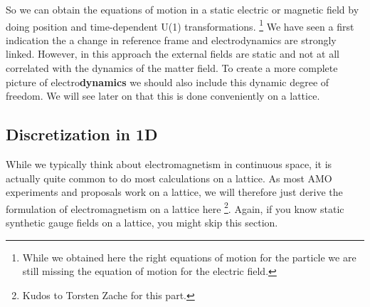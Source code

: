 \documentclass[10pt]{article}
\begin{document}
So we can obtain the equations of motion in a static electric or magnetic field by doing position and time-dependent U(1) transformations.
\footnote{While we obtained here the right equations of motion for the particle we are still missing the equation of motion for the electric field.}
We have seen a first indication the a change in reference frame and electrodynamics are strongly linked. However, in this approach the external fields are static and not at all correlated with the dynamics of the matter field. To create a more complete picture of electro\textbf{dynamics} we should also include this dynamic degree of freedom. We will see later on that this is done conveniently on a lattice. 

\subsection{Discretization in 1D}

While we typically think about electromagnetism in continuous space, it is actually quite common to do most calculations on a lattice. As most AMO experiments and proposals work on a lattice, we will therefore just derive the formulation of electromagnetism on a lattice here  \footnote{Kudos to Torsten Zache for this part.}. Again, if you know static synthetic gauge fields on a lattice, you might skip this section.
\end{document}
